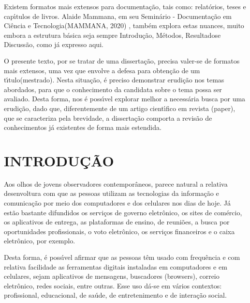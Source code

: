 \documentclass[
12pt,		%
openright,	%
twoside,  %
a4paper,			%
chapter=TITLE,		%
english,			%
french,				%
spanish,			%
brazil				%
]{USPSC-classe/USPSC}
\begin{document}
Existem formatos mais extensos para documenta\c{c}\~ao, tais como: relat\'orios, teses e cap\'{\i}tulos de livros. Alaide Mammana, em seu \textquotedbl Semin\'ario - Documenta\c{c}\~ao em Ci\^encia e Tecnologia\textquotedbl   (MAMMANA, 2020) , tamb\'em explora estas nuances, muito embora a estrutura b\'asica seja sempre \textquotedbl Introdu\c{c}\~ao\textquotedbl , \textquotedbl M\'etodos\textquotedbl , \textquotedbl Resultados\textquotedbl  e \textquotedbl Discuss\~ao\textquotedbl , como j\'a expresso aqui.










O presente texto, por se tratar de uma disserta\c{c}\~ao, precisa valer-se de formatos mais extensos, uma vez que envolve a \textquotedbl defesa para obten\c{c}\~ao de um t\'{\i}tulo\textquotedbl  (mestrado). Nesta situa\c{c}\~ao, \'e preciso demonstrar erudi\c{c}\~ao nos temas abordados, para que o conhecimento da candidata sobre o tema possa ser avaliado. Desta forma, nos \'e poss\'{\i}vel explorar melhor a necess\'aria busca por uma erudi\c{c}\~ao, dado que, diferentemente de um artigo cient\'{\i}fico em revista (\textquotedbl paper\textquotedbl ), que se caracteriza pela brevidade, a disserta\c{c}\~ao  comporta a revis\~ao de conhecimentos j\'a existentes de forma mais estendida.










\chapter[INTRODU\c{C}\~AO]{INTRODU\c{C}\~AO}\label{INTRODU\c{C}\~AO}
Aos olhos de jovens observadores contempor\^aneos, parece natural a relativa desenvoltura com que as pessoas utilizam  as tecnologias da informa\c{c}\~ao e comunica\c{c}\~ao por meio dos  computadores e dos celulares nos dias de hoje. J\'a est\~ao bastante difundidos os servi\c{c}os de governo eletr\^onico, os sites de com\'ercio, os  aplicativos de entrega, as plataformas de ensino, de reuni\~oes, a busca por oportunidades profissionais, o voto eletr\^onico, os servi\c{c}os financeiros e o caixa eletr\^onico, por exemplo.










Desta forma, \'e poss\'{\i}vel afirmar que as pessoas t\^em usado com frequ\^encia e com relativa facilidade as ferramentas digitais instaladas em computadores e em celulares, sejam aplicativos de mensagens, buscadores (browsers), correio eletr\^onico, redes sociais, entre outras. Esse uso d\'a-se em v\'arios contextos: profissional, educacional, de sa\'ude,  de entretenimento e de intera\c{c}\~ao social.
\end{document}
